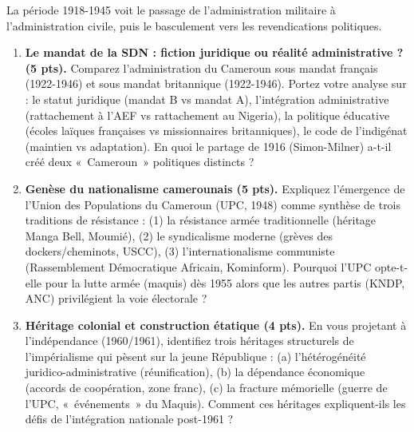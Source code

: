 \documentclass[11pt]{article}
\begin{document}
\begin{exercice}
\noindent La période 1918-1945 voit le passage de l'administration militaire à l'administration civile, puis le basculement vers les revendications politiques.

\begin{enumerate}
    \item \textbf{Le mandat de la SDN : fiction juridique ou réalité administrative ? (5 pts).} Comparez l'administration du Cameroun sous mandat français (1922-1946) et sous mandat britannique (1922-1946). Portez votre analyse sur : le statut juridique (mandat B vs mandat A), l'intégration administrative (rattachement à l'AEF vs rattachement au Nigeria), la politique éducative (écoles laïques françaises vs missionnaires britanniques), le code de l'indigénat (maintien vs adaptation). En quoi le partage de 1916 (Simon-Milner) a-t-il créé deux «~Cameroun~» politiques distincts ?
    \item \textbf{Genèse du nationalisme camerounais (5 pts).} Expliquez l'émergence de l'Union des Populations du Cameroun (UPC, 1948) comme synthèse de trois traditions de résistance : (1) la résistance armée traditionnelle (héritage Manga Bell, Moumié), (2) le syndicalisme moderne (grèves des dockers/cheminots, USCC), (3) l'internationalisme communiste (Rassemblement Démocratique Africain, Kominform). Pourquoi l'UPC opte-t-elle pour la lutte armée (maquis) dès 1955 alors que les autres partis (KNDP, ANC) privilégient la voie électorale ?
    \item \textbf{Héritage colonial et construction étatique (4 pts).} En vous projetant à l'indépendance (1960/1961), identifiez trois héritages structurels de l'impérialisme qui pèsent sur la jeune République : (a) l'hétérogénéité juridico-administrative (réunification), (b) la dépendance économique (accords de coopération, zone franc), (c) la fracture mémorielle (guerre de l'UPC, «~événements~» du Maquis). Comment ces héritages expliquent-ils les défis de l'intégration nationale post-1961 ?
\end{enumerate}
\end{exercice}
\end{document}

